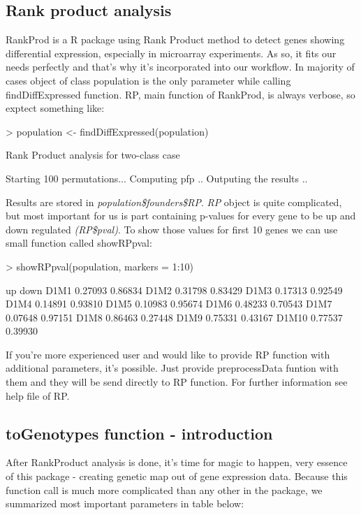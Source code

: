 \documentclass{article}
\begin{document}
\subsection{Rank product analysis}
RankProd \citep{Hong:2006} is a R package using Rank Product \citep{Breitling200483} method to detect genes showing differential expression, especially in microarray experiments. As so, it fits our needs perfectly and that's why it's incorporated into our workflow. 
In majority of cases object of class population is the only parameter while calling findDiffExpressed function. RP, main function of RankProd, is always verbose, so exptect something like:
\begin{Schunk}
\begin{Sinput}
> population <- findDiffExpressed(population)
\end{Sinput}
\begin{Soutput}
Rank Product analysis for two-class case 
 
Starting 100 permutations... 
Computing pfp .. 
Outputing the results .. 
\end{Soutput}
\end{Schunk}

{\noindent}Results are stored in \emph{population\$founders\$RP}. \emph{RP} object is quite complicated, but most important for us is part containing p-values for every gene to be up and down regulated \emph{(RP\$pval)}. To show those values for first 10 genes
we can use small function called showRPpval:
\begin{Schunk}
\begin{Sinput}
> showRPpval(population, markers = 1:10)
\end{Sinput}
\begin{Soutput}
           up    down
D1M1  0.27093 0.86834
D1M2  0.31798 0.83429
D1M3  0.17313 0.92549
D1M4  0.14891 0.93810
D1M5  0.10983 0.95674
D1M6  0.48233 0.70543
D1M7  0.07648 0.97151
D1M8  0.86463 0.27448
D1M9  0.75331 0.43167
D1M10 0.77537 0.39930
\end{Soutput}
\end{Schunk}

{\noindent}If you're more experienced user and would like to provide RP function with additional parameters, it's possible. Just provide preprocessData funtion with them and they will be send directly to RP function. For further information see help file of RP.

\subsection{toGenotypes function - introduction}
After RankProduct analysis is done, it's time for magic to happen,  very essence of this package - creating genetic map out of gene expression data. Because this function call is much more complicated than any other in the 
package, we summarized most important parameters in table below:
\end{document}
